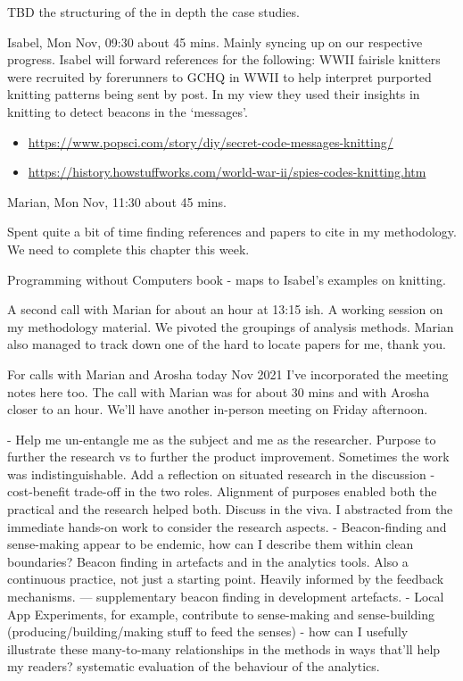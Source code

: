 TBD the structuring of the in depth the case studies.

\dotfill

Isabel, Mon  Nov, 09:30 about 45 mins.
Mainly syncing up on our respective progress. Isabel will forward references for the following: 
WWII fairisle knitters were recruited by forerunners to GCHQ in WWII to help interpret purported knitting patterns being sent by post. In my view they used their insights in knitting to detect beacons in the `messages'. 

\begin{itemize}
    \item \url{https://www.popsci.com/story/diy/secret-code-messages-knitting/}
    \item \url{https://history.howstuffworks.com/world-war-ii/spies-codes-knitting.htm}
\end{itemize}

\dotfill

Marian, Mon  Nov, 11:30 about 45 mins.

Spent quite a bit of time finding references and papers to cite in my methodology. We need to complete this chapter this week.

Programming without Computers book - maps to Isabel's examples on knitting.

A second call with Marian for about an hour at 13:15 ish. A working session on my methodology material. We pivoted the groupings of analysis methods. 
Marian also managed to track down one of the hard to locate papers for me, thank you.

\dotfill

For calls with Marian and Arosha today  Nov 2021
I've incorporated the meeting notes here too. The call with Marian was for about 30 mins and with Arosha closer to an hour. We'll have another in-person meeting on Friday afternoon.

- Help me un-entangle me as the subject and me as the researcher. Purpose to further the research vs to further the product improvement. Sometimes the work was indistinguishable. Add a reflection on situated research in the discussion - cost-benefit trade-off in the two roles. Alignment of purposes enabled both the practical and the research helped both. Discuss in the viva. I abstracted from the immediate hands-on work to consider the research aspects. 
- Beacon-finding and sense-making appear to be endemic, how can I describe them within clean boundaries? Beacon finding in artefacts and in the analytics tools. Also a continuous practice, not just a starting point. Heavily informed by the feedback mechanisms. 
--- supplementary beacon finding in development artefacts. 
- Local App Experiments, for example, contribute to sense-making and sense-building (producing/building/making stuff to feed the senses) - how can I usefully illustrate these many-to-many relationships in the methods in ways that'll help my readers? systematic evaluation of the behaviour of the analytics. 

